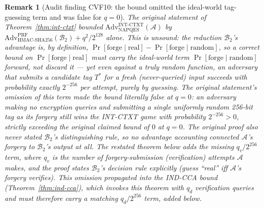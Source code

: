 \documentclass[11pt,a4paper]{article}
\newtheorem{remark}[theorem]{Remark}
\begin{document}
\begin{remark}[Audit finding CVF10: the bound omitted the ideal-world tag-guessing term and was false for $q=0$]
\label{rem:cvf10}
The original statement of Theorem~\ref{thm:int-ctxt} bounded
$\mathrm{Adv}^{\mathrm{INT\text{-}CTXT}}_{\mathrm{NAPQES}}(\mathcal{A})$ by
$\mathrm{Adv}^{\mathrm{PRF}}_{\mathrm{HMAC\text{-}SHA256}}(\mathcal{B}_2) + q^2/2^{128}$
alone. This is unsound: the reduction $\mathcal{B}_2$'s advantage is, by
definition, $\Pr[\text{forge}\mid\text{real}] - \Pr[\text{forge}\mid\text{random}]$,
so a correct bound on $\Pr[\text{forge}\mid\text{real}]$ must carry the
ideal-world term $\Pr[\text{forge}\mid\text{random}]$ forward, not discard
it --- yet even against a \emph{truly random} function, an adversary that
submits a candidate tag $T^*$ for a fresh (never-queried) input succeeds
with probability exactly $2^{-256}$ per attempt, purely by guessing. The
original statement's omission of this term made the bound literally false
at $q=0$: an adversary making \emph{no} encryption queries and submitting
a single uniformly random 256-bit tag as its forgery still wins the
INT-CTXT game with probability $2^{-256} > 0$, strictly exceeding the
original claimed bound of $0$ at $q=0$. The original proof also never
stated $\mathcal{B}_2$'s distinguishing rule, so no advantage accounting
connected $\mathcal{A}$'s forgery to $\mathcal{B}_2$'s output at all. The
restated theorem below adds the missing $q_v/2^{256}$ term, where $q_v$ is
the number of forgery-submission (verification) attempts $\mathcal{A}$
makes, and the proof states $\mathcal{B}_2$'s decision rule explicitly
(guess ``real'' iff $\mathcal{A}$'s forgery verifies). This omission
propagated into the IND-CCA bound (Theorem~\ref{thm:ind-cca}), which
invokes this theorem with $q_d$ verification queries and must therefore
carry a matching $q_d/2^{256}$ term, added below.
\end{remark}
\end{document}
